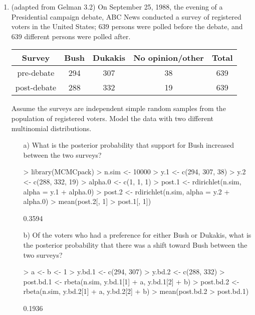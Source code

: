\documentclass[10pt,a4paper]{article}
\newcommand{\red}{\color{red}}
\newcommand{\black}{\color{black}}
\begin{document}
\begin{enumerate}
\bigskip

\item (adapted from Gelman 3.2) On September 25, 1988, the evening of a Presidential campaign debate, ABC News conducted a survey of registered voters in the United States; 639 persons were polled before the debate, and 639 different persons were polled after.  \\

\begin{table}[!htp]
\begin{center}
\begin{tabular}{ccccc}
Survey & Bush & Dukakis & No opinion/other & Total \\
\hline
pre-debate & 294 & 307 & 38 & 639 \\
post-debate & 288 & 332 & 19 & 639 \\
\end{tabular}
\end{center}
\end{table}

Assume the surveys are independent simple random samples from the population of registered voters.  Model the data with two different multinomial distributions.
\begin{enumerate}
\item[a)] What is the posterior probability that support for Bush increased between the two surveys?

\medskip \red \small
\begin{Schunk}
\begin{Sinput}
> library(MCMCpack)
> n.sim <- 10000
> y.1 <- c(294, 307, 38)
> y.2 <- c(288, 332, 19)
> alpha.0 <- c(1, 1, 1)
> post.1 <- rdirichlet(n.sim, alpha = y.1 + alpha.0)
> post.2 <- rdirichlet(n.sim, alpha = y.2 + alpha.0)
> mean(post.2[, 1] > post.1[, 1])
\end{Sinput}
\begin{Soutput}
[1] 0.3594
\end{Soutput}
\end{Schunk}
\medskip \black \normalsize 

\item[b)] Of the voters who had a preference for either Bush or Dukakis, what is the posterior probability that there was a shift toward Bush between the two surveys?

\medskip \red \small
\begin{Schunk}
\begin{Sinput}
> a <- b <- 1
> y.bd.1 <- c(294, 307)
> y.bd.2 <- c(288, 332)
> post.bd.1 <- rbeta(n.sim, y.bd.1[1] + a, y.bd.1[2] + b)
> post.bd.2 <- rbeta(n.sim, y.bd.2[1] + a, y.bd.2[2] + b)
> mean(post.bd.2 > post.bd.1)
\end{Sinput}
\begin{Soutput}
[1] 0.1936
\end{Soutput}
\end{Schunk}
\medskip \black \normalsize


\end{enumerate}
\end{enumerate}
\end{document}
